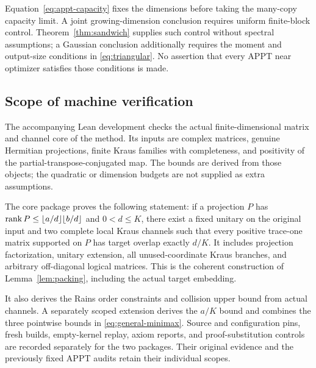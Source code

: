 Equation~\eqref{eq:appt-capacity} fixes the dimensions before taking the many-copy capacity limit. A joint growing-dimension conclusion requires uniform finite-block control. Theorem~\ref{thm:sandwich} supplies such control without spectral assumptions; a Gaussian conclusion additionally requires the moment and output-size conditions in \eqref{eq:triangular}. No assertion that every APPT near optimizer satisfies those conditions is made.

\subsection{Scope of machine verification}
The accompanying Lean development checks the actual finite-dimensional matrix and channel core of the method. Its inputs are complex matrices, genuine Hermitian projections, finite Kraus families with completeness, and positivity of the partial-transpose-conjugated map. The bounds are derived from those objects; the quadratic or dimension budgets are not supplied as extra assumptions.

The core package proves the following statement: if a projection $P$ has
$\operatorname{rank} P\le\lfloor a/d\rfloor\lfloor b/d\rfloor$ and $0<d\le K$, there exist a fixed unitary on the original input and two complete local Kraus channels such that every positive trace-one matrix supported on $P$ has target overlap exactly $d/K$. It includes projection factorization, unitary extension, all unused-coordinate Kraus branches, and arbitrary off-diagonal logical matrices. This is the coherent construction of Lemma~\ref{lem:packing}, including the actual target embedding.

It also derives the Rains order constraints and collision upper bound from actual channels. A separately scoped extension derives the $a/K$ bound and combines the three pointwise bounds in \eqref{eq:general-minimax}. Source and configuration pins, fresh builds, empty-kernel replay, axiom reports, and proof-substitution controls are recorded separately for the two packages. Their original evidence and the previously fixed APPT audits retain their individual scopes.

